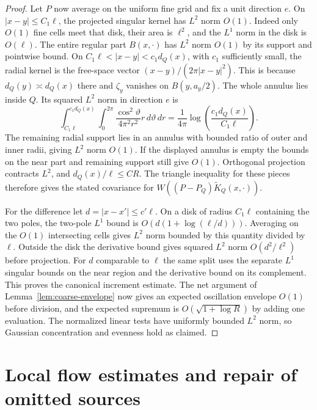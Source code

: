 \documentclass[11pt]{article}
\newcommand{\1}{\mathbf{1}}
\numberwithin{equation}{section}
\begin{document}
\begin{proof}
Let \(P\) now average on the uniform fine grid and fix a unit
direction \(e\). On \(|x-y|\le C_1\ell\), the projected
singular kernel has \(L^2\) norm \(O(1)\). Indeed only \(O(1)\)
fine cells meet that disk, their area is \(\ell^2\), and the
\(L^1\) norm in the disk is \(O(\ell)\). The entire regular
part \(B(x,\cdot)\) has \(L^2\) norm \(O(1)\) by its support
and pointwise bound. On
\(C_1\ell<|x-y|<c_1d_Q(x)\), with \(c_1\) sufficiently small,
the radial kernel is the free-space vector
\((x-y)/(2\pi|x-y|^2)\). This is because \(d_Q(y)\asymp d_Q(x)\)
there and \(\zeta_y\) vanishes on \(B(y,a_y/2)\).
The whole annulus lies inside \(Q\). Its squared \(L^2\) norm
in direction \(e\) is
\[
 \int_{C_1\ell}^{c_1d_Q(x)}
       \int_0^{2\pi}\frac{\cos^2\vartheta}{4\pi^2 r^2}
              r\,d\vartheta\,dr
 = \frac{1}{4\pi}\log\!\left(\frac{c_1d_Q(x)}{C_1\ell}\right).
\]
The remaining radial support lies in an annulus with bounded
ratio of outer and inner radii, giving \(L^2\) norm \(O(1)\).
If the displayed annulus is empty the bounds on the near
part and remaining support still give \(O(1)\).
Orthogonal projection contracts \(L^2\), and
\(d_Q(x)/\ell\le CR\). The triangle inequality for these
pieces therefore gives the stated covariance for
\(W((P-P_Q)\widetilde K_Q(x,\cdot))\).

For the difference let \(d=|x-x'|\le c'\ell\). On a disk
of radius \(C_1\ell\) containing the two poles, the two-pole
\(L^1\) bound is \(O(d(1+\log(\ell/d)))\). Averaging on the
\(O(1)\) intersecting cells gives \(L^2\) norm bounded by this
quantity divided by \(\ell\). Outside the disk the derivative
bound gives squared \(L^2\) norm \(O(d^2/\ell^2)\) before
projection. For \(d\) comparable to \(\ell\) the same split
uses the separate \(L^1\) singular bounds on the near region
and the derivative bound on its complement. This proves the
canonical increment estimate. The net argument of
Lemma~\ref{lem:coarse-envelope} now gives an expected oscillation
envelope \(O(1)\) before division, and the expected supremum is
\(O(\sqrt{1+\log R})\) by adding one evaluation. The normalized
linear tests have uniformly bounded \(L^2\) norm, so Gaussian
concentration and evenness hold as claimed.
\end{proof}

\section{Local flow estimates and repair of omitted sources}
\label{sec:sc-repairs}
\end{document}

